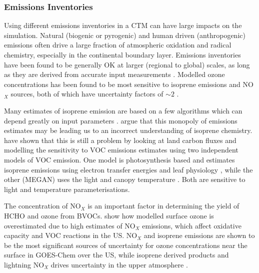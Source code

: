     \subsubsection{Emissions Inventories}
      Using different emissions inventories in a CTM can have large impacts on the simulation.
      Natural (biogenic or pyrogenic) and human driven (anthropogenic) emissions often drive a large fraction of atmospheric oxidation and radical chemistry, especially in the continental boundary layer.
      Emissions inventories have been found to be generally OK at larger (regional to global) scales, as long as they are derived from accurate input measurements \parencite{Zeng2015}.
      Modelled ozone concentrations has been found to be most sensitive to isoprene emissions and NO$_X$ sources, both of which have uncertainty factors of $\sim 2$ \parencite{Christian2017}.
      
      Many estimates of isoprene emission are based on a few algorithms which can depend greatly on input parameters \parencite{Arneth2008,Niinemets2010}.
      \textcite{Arneth2008} argue that this monopoly of emissions estimates may be leading us to an incorrect understanding of isoprene chemistry.
      \textcite{Yue2015} have shown that this is still a problem by looking at land carbon fluxes and modelling the sensitivity to VOC emissions estimates using two independent models of VOC emission.
      One model is photosynthesis based and estimates isoprene emissions using electron transfer energies and leaf physiology \parencite{Niinemets1999}, while the other (MEGAN) uses the light and canopy temperature \parencite{Guenther1995,Arneth2007}.
      Both are sensitive to light and temperature parameterisations.
      
      The concentration of NO$_X$ is an important factor in determining the yield of HCHO and ozone from BVOCs.
      \textcite{Travis2016} show how modelled surface ozone is overestimated due to high estimates of NO$_X$ emissions, which affect oxidative capacity and VOC reactions in the US.
      NO$_X$ and isoprene emissions are shown to be the most significant sources of uncertainty for ozone concentrations near the surface in GOES-Chem over the US, while isoprene derived products and lightning NO$_X$ drives uncertainty in the upper atmosphere \parencite{Christian2017}.
      
